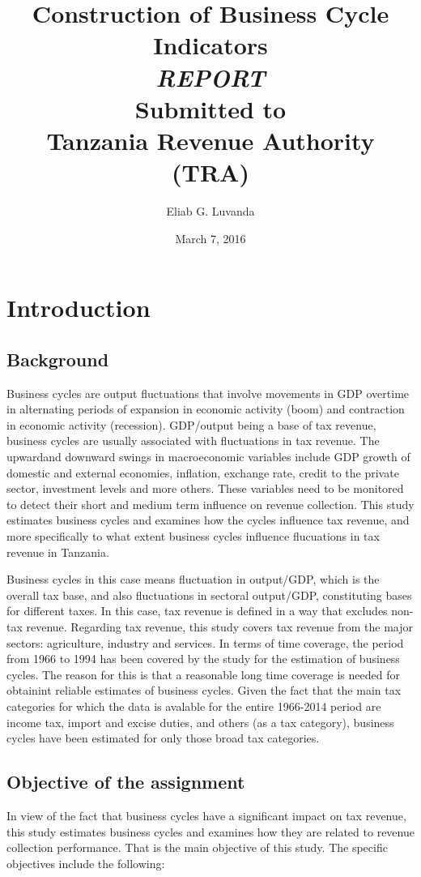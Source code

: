 \documentclass[12pt,a4paper,final]{article}
\author{Eliab G. Luvanda}
\title{Construction of Business Cycle Indicators \\
\textit{REPORT} \\
Submitted to \\
\textbf{Tanzania Revenue Authority (TRA)}}
\date{March 7, 2016}
\begin{document}
\maketitle

\newpage
\tableofcontents

\listoffigures

\listoftables

\newpage
\section{Introduction}

\subsection{Background}
Business cycles are output fluctuations that involve movements in GDP overtime in alternating periods of expansion in economic activity (boom) and contraction in economic activity (recession). GDP/output being a base of tax revenue, business cycles are usually associated with fluctuations in tax revenue.  The upwardand downward swings in macroeconomic variables include GDP growth of domestic  and external economies, inflation, exchange rate, credit to the private sector, investment levels and more others.  These variables need to be monitored to detect their short and medium term influence on revenue collection. This study estimates business cycles and  examines how the cycles influence tax revenue, and more specifically to what extent business cycles influence flucuations in tax revenue in Tanzania.  

Business cycles in this case means fluctuation in output/GDP, which is the overall tax base, and also fluctuations in sectoral output/GDP, constituting bases for different taxes. In this case, tax revenue is defined in a way that excludes non-tax revenue.  Regarding tax revenue, this study covers tax revenue from the major sectors: agriculture, industry and services. In terms of time coverage, the period from 1966 to 1994 has been covered by the study for the estimation of business cycles. The reason for this is that a reasonable long time coverage is needed for obtainint reliable estimates of business cycles.  Given the fact that the main  tax categories for which the data is avalable for the entire 1966-2014 period are income tax, import and excise duties, and others (as a tax category), business cycles have been estimated for only those broad tax categories. 

\subsection{Objective of the assignment}
In view of the fact that business cycles have a significant impact on tax revenue, this study estimates business cycles and examines how they are related  to revenue collection performance.  That is the main objective of this study.  The specific objectives include the following:
\end{document}
